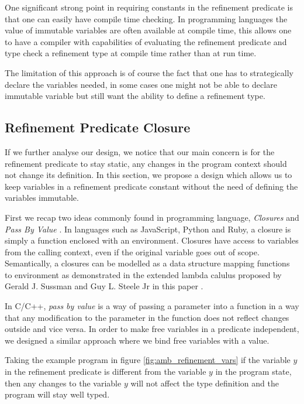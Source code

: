 \documentclass[a4paper,12pt]{report}
\begin{document}
\par
One significant strong point in requiring constants in the refinement predicate 
is that one can easily have compile time checking. In programming languages 
the value of immutable variables are often available at compile time, this 
allows one to have a compiler with capabilities of evaluating the refinement 
predicate and type check a refinement type at compile time rather than at run 
time. 

\par
The limitation of this approach is of course the fact that one has to strategically 
declare the variables needed, in some cases one might not be able to declare 
immutable variable but still want the ability to define a refinement type.

\subsection{Refinement Predicate Closure}
If we further analyse our design, we notice that our main concern is for the 
refinement predicate to stay static, any changes in the program context should 
not change its definition. In this section, we propose a design which allows us 
to keep variables in a refinement predicate constant without the need of 
defining the variables immutable.

\par
First we recap two ideas commonly found in programming language, \textit{Closures} 
\cite{closures} and \textit{Pass By Value} \cite{pbv}.
In languages such as JavaScript, Python and Ruby, a closure is simply a  
function enclosed with an environment. Closures have access to 
variables from the calling context, even if the original variable goes out of 
scope. Semantically, a closures can be modelled as a data structure mapping 
functions to environment as demonstrated in the extended lambda calulus proposed by 
Gerald J. Sussman and Guy L. Steele Jr in this paper \cite{closureLambdaOp}. 

\par
In C/C++, \textit{pass by value} \cite{pbv} is a way of passing a 
parameter into a function in a way that any modification to the 
parameter in the function does not reflect changes outside and vice versa. In 
order to make free variables in a predicate independent, we designed a similar 
approach where we bind free variables with a value. 

\par
Taking the example program in figure \ref{fig:amb_refinement_vars} if the 
variable $y$ in the refinement predicate is different from the variable 
$y$ in the program state, then any changes to the variable $y$ will not 
affect the type definition and the program 
will stay well typed.
\end{document}
